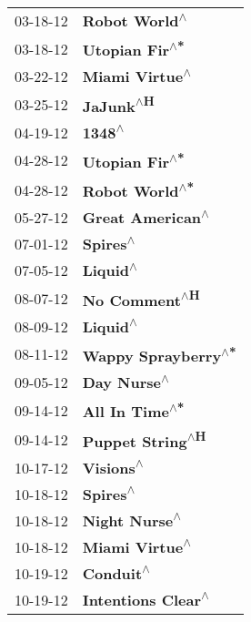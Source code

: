 \begin{supertabular}{p{0.25\columnwidth}p{0.75\columnwidth}}
 03-18-12 &                  \textbf{Robot World\textsuperscript{$\wedge$}} \\
 03-18-12 &                 \textbf{Utopian Fir\textsuperscript{$\wedge$*}} \\
 03-22-12 &                 \textbf{Miami Virtue\textsuperscript{$\wedge$}} \\
 03-25-12 &                      \textbf{JaJunk\textsuperscript{$\wedge$H}} \\
 04-19-12 &                         \textbf{1348\textsuperscript{$\wedge$}} \\
 04-28-12 &                 \textbf{Utopian Fir\textsuperscript{$\wedge$*}} \\
 04-28-12 &                 \textbf{Robot World\textsuperscript{$\wedge$*}} \\
 05-27-12 &               \textbf{Great American\textsuperscript{$\wedge$}} \\
 07-01-12 &                       \textbf{Spires\textsuperscript{$\wedge$}} \\
 07-05-12 &                       \textbf{Liquid\textsuperscript{$\wedge$}} \\
 08-07-12 &                  \textbf{No Comment\textsuperscript{$\wedge$H}} \\
 08-09-12 &                       \textbf{Liquid\textsuperscript{$\wedge$}} \\
 08-11-12 &            \textbf{Wappy Sprayberry\textsuperscript{$\wedge$*}} \\
 09-05-12 &                    \textbf{Day Nurse\textsuperscript{$\wedge$}} \\
 09-14-12 &                 \textbf{All In Time\textsuperscript{$\wedge$*}} \\
 09-14-12 &               \textbf{Puppet String\textsuperscript{$\wedge$H}} \\
 10-17-12 &                      \textbf{Visions\textsuperscript{$\wedge$}} \\
 10-18-12 &                       \textbf{Spires\textsuperscript{$\wedge$}} \\
 10-18-12 &                  \textbf{Night Nurse\textsuperscript{$\wedge$}} \\
 10-18-12 &                 \textbf{Miami Virtue\textsuperscript{$\wedge$}} \\
 10-19-12 &                      \textbf{Conduit\textsuperscript{$\wedge$}} \\
 10-19-12 &             \textbf{Intentions Clear\textsuperscript{$\wedge$}} \\

\end{supertabular}
